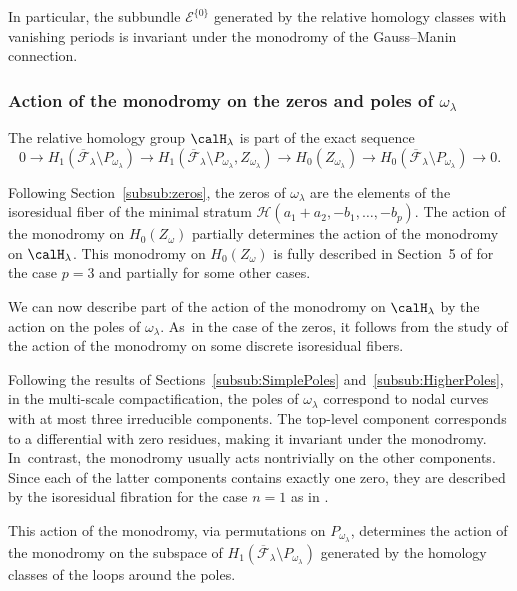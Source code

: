 In particular, the subbundle $\mathcal{E}^{\lbrace{ 0 \rbrace}}$ generated by the relative homology classes with vanishing periods is invariant under the monodromy of the Gauss--Manin connection.

\subsubsection{Action of the monodromy on the zeros and poles of $\omega_{\lambda}$}\label{subsub:MonodromyZerosPoles}

The relative homology group $\calH_{\lambda}$ is part of the exact sequence
\[
0 \to
H_{1}(\overline{\mathcal{F}}_{\lambda} \setminus P_{\omega_{\lambda}})
\to H_{1}(\overline{\mathcal{F}}_{\lambda} \setminus P_{\omega_{\lambda}}, Z_{\omega_{\lambda}})
\to
H_{0}(Z_{\omega_{\lambda}})
\to
H_{0}(\overline{\mathcal{F}}_{\lambda} \setminus P_{\omega_{\lambda}})
\to 0.
\]

Following Section~\ref{subsub:zeros}, the zeros of $\omega_{\lambda}$ are the elements of the isoresidual fiber of the minimal stratum $\mathcal{H}(a_{1}+a_{2},-b_{1},\dots,-b_{p})$. The action of the monodromy on $H_{0}(Z_{\omega})$ partially determines the action of the monodromy on $\calH_{\lambda}$. This monodromy on $H_{0}(Z_{\omega})$ is fully described in Section~5 of \cite{GeTaIso} for the case $p=3$ and partially for some other cases.

We can now describe part of the action of the monodromy on $\calH_{\lambda}$ by the action on the poles of $\omega_{\lambda}$. As~in the case of the zeros, it follows from the study of the action of the monodromy on some discrete isoresidual fibers.

Following the results of Sections~\ref{subsub:SimplePoles} and~\ref{subsub:HigherPoles}, in the multi-scale compactification, the poles of $\omega_{\lambda}$ correspond to nodal curves with at most three irreducible components. The top-level component corresponds to a differential with zero residues, making it invariant under the monodromy. In~contrast, the monodromy usually acts nontrivially on the other components. Since each of the latter components contains exactly one zero, they are described by the isoresidual fibration for the case $n=1$ as in \cite{GeTaIso}.

This action of the monodromy, via permutations on $P_{\omega_{\lambda}}$, determines the action of the monodromy on the subspace of
$H_{1}(\overline{\mathcal{F}}_{\lambda} \setminus P_{\omega_{\lambda}})$ generated by the homology classes of the loops around the poles.

